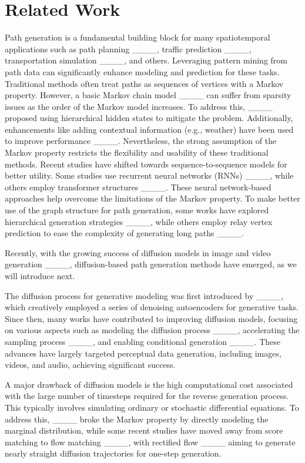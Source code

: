 \section{Related Work}
\label{sec:related}

Path generation is a fundamental building block for many spatiotemporal applications such as path planning ____, traffic prediction ____, transportation simulation ____, and others. 
Leveraging pattern mining from path data can significantly enhance modeling and prediction for these tasks.
Traditional methods often treat paths as sequences of vertices with a Markov property. 
However, a basic Markov chain model ____ can suffer from sparsity issues as the order of the Markov model increases. 
To address this, ____ proposed using hierarchical hidden states to mitigate the problem. 
Additionally, enhancements like adding contextual information (e.g., weather) have been used to improve performance ____.
Nevertheless, the strong assumption of the Markov property restricts the flexibility and usability of these traditional methods. 
Recent studies have shifted towards sequence-to-sequence models for better utility. 
Some studies use recurrent neural networks (RNNs) ____, while others employ transformer structures ____. 
These neural network-based approaches help overcome the limitations of the Markov property.
To make better use of the graph structure for path generation, some works have explored hierarchical generation strategies ____, while others employ relay vertex prediction to ease the complexity of generating long paths ____.

Recently, with the growing success of diffusion models in image and video generation ____, diffusion-based path generation methods have emerged, as we will introduce next.


The diffusion process for generative modeling was first introduced by ____, which creatively employed a series of denoising autoencoders for generative tasks. 
Since then, many works have contributed to improving diffusion models, focusing on various aspects such as modeling the diffusion process ____, accelerating the sampling process ____, and enabling conditional generation ____. 
These advances have largely targeted perceptual data generation, including images, videos, and audio, achieving significant success.

A major drawback of diffusion models is the high computational cost associated with the large number of timesteps required for the reverse generation process. 
This typically involves simulating ordinary or stochastic differential equations. 
To address this, ____ broke the Markov property by directly modeling the marginal distribution, while some recent studies have moved away from score matching to flow matching ____, with rectified flow ____ aiming to generate nearly straight diffusion trajectories for one-step generation.


